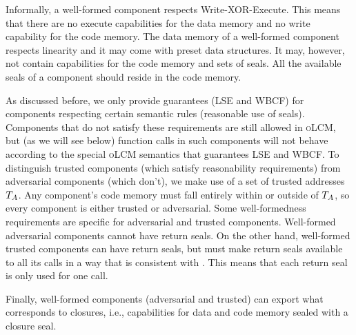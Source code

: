 \documentclass[acmsmall,screen]{acmart}\settopmatter{}
\newcommand{\srccm}{\textsc{oLCM}}
\newenvironment{jversion}%
    {\color{OliveGreen}}{}
\begin{document}
\begin{jversion}
  Informally, a well-formed component respects Write-XOR-Execute.
  This means that there are no execute capabilities for the data memory and no write capability for the code memory.
  The data memory of a well-formed component respects linearity and it may come with preset data structures.
  It may, however, not contain capabilities for the code memory and sets of seals.
  All the available seals of a component should reside in the code memory.

  As discussed before, we only provide guarantees (LSE and WBCF) for components respecting certain semantic rules (reasonable use of seals).
  Components that do not satisfy these requirements are still allowed in \srccm{}, but (as we will see below) function calls in such components will not behave according to the special \srccm{} semantics that guarantees LSE and WBCF.
  To distinguish trusted components (which satisfy reasonability requirements) from adversarial components (which don't), we make use of a set of trusted addresses $T_{A}$.
  Any component's code memory must fall entirely within or outside of $T_{A}$, so every component is either trusted or adversarial.
  Some well-formedness requirements are specific for adversarial and trusted components.
  Well-formed adversarial components cannot have return seals.
  On the other hand, well-formed trusted components can have return seals, but must make return seals available to all its calls in a way that is consistent with \stktokens{}.
  This means that each return seal is only used for one call.

  Finally, well-formed components (adversarial and trusted) can export what corresponds to closures, i.e.,  capabilities for data and code memory sealed with a closure seal.
\end{jversion}
\end{document}
